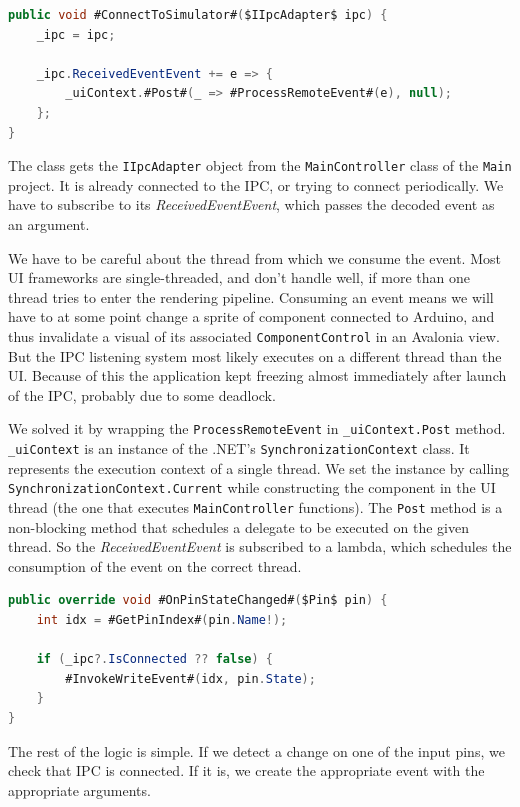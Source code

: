 \begin{lstlisting}[language=csharp, caption={\texttt{Arduino.ConnectToSimulator} method}]
public void #ConnectToSimulator#($IIpcAdapter$ ipc) {
    _ipc = ipc;
    
    _ipc.ReceivedEventEvent += e => {
        _uiContext.#Post#(_ => #ProcessRemoteEvent#(e), null);    
    };
}
\end{lstlisting}

The class gets the \texttt{IIpcAdapter} object from the \texttt{MainController} class of the \texttt{Main} project. It is already connected to the IPC, or trying to connect periodically. We have to subscribe to its \textit{ReceivedEventEvent}, which passes the decoded event as an argument.

We have to be careful about the thread from which we consume the event. Most UI frameworks are single-threaded, and don't handle well, if more than one thread tries to enter the rendering pipeline. Consuming an event means we will have to at some point change a sprite of component connected to Arduino, and thus invalidate a visual of its associated \texttt{ComponentControl} in an Avalonia view. But the IPC listening system most likely executes on a different thread than the UI. Because of this the application kept freezing almost immediately after launch of the IPC, probably due to some deadlock. 

We solved it by wrapping the \texttt{ProcessRemoteEvent} in \texttt{\_uiContext.Post} method. \texttt{\_uiContext} is an instance of the .NET's \texttt{SynchronizationContext} class. It represents the execution context of a single thread. We set the instance by calling \texttt{SynchronizationContext.Current} while constructing the component in the UI thread (the one that executes \texttt{MainController} functions). The \texttt{Post} method is a non-blocking method that schedules a delegate to be executed on the given thread. So the \textit{ReceivedEventEvent} is subscribed to a lambda, which schedules the consumption of the event on the correct thread.

\begin{lstlisting}[language=csharp, caption={\texttt{Arduino.OnPinStateChanged} method}]
public override void #OnPinStateChanged#($Pin$ pin) {
    int idx = #GetPinIndex#(pin.Name!);
    
    if (_ipc?.IsConnected ?? false) {
        #InvokeWriteEvent#(idx, pin.State);
    }
}
\end{lstlisting}

The rest of the logic is simple. If we detect a change on one of the input pins, we check that IPC is connected. If it is, we create the appropriate event with the appropriate arguments.
 
